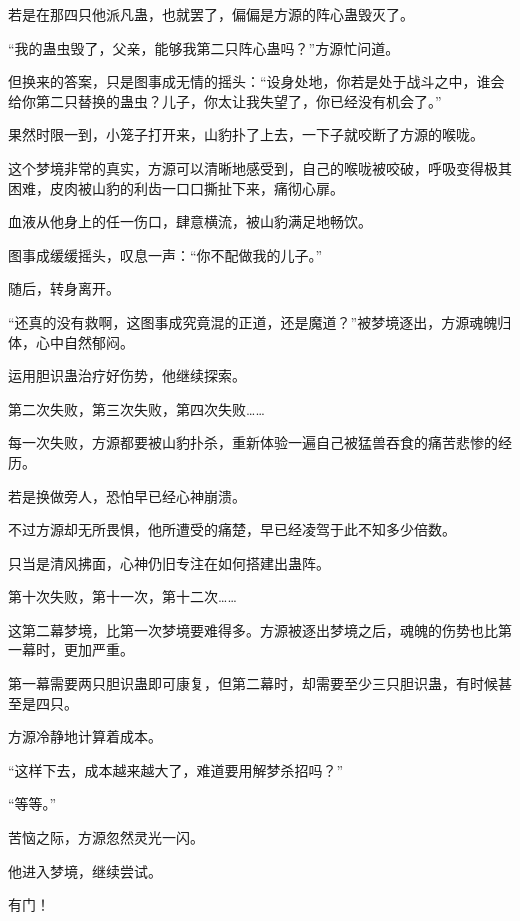 \begin{this_body}
若是在那四只他派凡蛊，也就罢了，偏偏是方源的阵心蛊毁灭了。

“我的蛊虫毁了，父亲，能够我第二只阵心蛊吗？”方源忙问道。

但换来的答案，只是图事成无情的摇头：“设身处地，你若是处于战斗之中，谁会给你第二只替换的蛊虫？儿子，你太让我失望了，你已经没有机会了。”

果然时限一到，小笼子打开来，山豹扑了上去，一下子就咬断了方源的喉咙。

这个梦境非常的真实，方源可以清晰地感受到，自己的喉咙被咬破，呼吸变得极其困难，皮肉被山豹的利齿一口口撕扯下来，痛彻心扉。

血液从他身上的任一伤口，肆意横流，被山豹满足地畅饮。

图事成缓缓摇头，叹息一声：“你不配做我的儿子。”

随后，转身离开。

“还真的没有救啊，这图事成究竟混的正道，还是魔道？”被梦境逐出，方源魂魄归体，心中自然郁闷。

运用胆识蛊治疗好伤势，他继续探索。

第二次失败，第三次失败，第四次失败……

每一次失败，方源都要被山豹扑杀，重新体验一遍自己被猛兽吞食的痛苦悲惨的经历。

若是换做旁人，恐怕早已经心神崩溃。

不过方源却无所畏惧，他所遭受的痛楚，早已经凌驾于此不知多少倍数。

只当是清风拂面，心神仍旧专注在如何搭建出蛊阵。

第十次失败，第十一次，第十二次……

这第二幕梦境，比第一次梦境要难得多。方源被逐出梦境之后，魂魄的伤势也比第一幕时，更加严重。

第一幕需要两只胆识蛊即可康复，但第二幕时，却需要至少三只胆识蛊，有时候甚至是四只。

方源冷静地计算着成本。

“这样下去，成本越来越大了，难道要用解梦杀招吗？”

“等等。”

苦恼之际，方源忽然灵光一闪。

他进入梦境，继续尝试。

有门！

\end{this_body}

